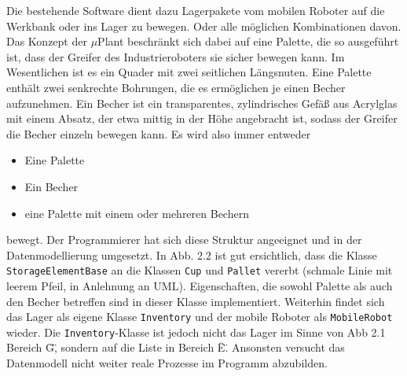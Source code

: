     Die bestehende Software dient dazu Lagerpakete vom mobilen Roboter auf die Werkbank oder ins Lager zu bewegen.
    Oder alle möglichen Kombinationen davon.
    Das Konzept der $\mu$Plant beschränkt sich dabei auf eine Palette, die so ausgeführt ist, dass der Greifer des
    Industrieroboters sie sicher bewegen kann.
    Im Wesentlichen ist es ein Quader mit zwei seitlichen Längsnuten.
    Eine Palette enthält zwei senkrechte Bohrungen, die es ermöglichen je einen Becher aufzunehmen.
    Ein Becher ist ein transparentes, zylindrisches Gefäß aus Acrylglas mit einem Absatz, der etwa mittig in der
    Höhe angebracht ist, sodass der Greifer die Becher einzeln bewegen kann.
    Es wird also immer entweder
    \begin{itemize}
        \item Eine Palette
        \item Ein Becher
        \item eine Palette mit einem oder mehreren Bechern
    \end{itemize}
    bewegt.
    Der Programmierer hat sich diese Struktur angeeignet und in der Datenmodellierung umgesetzt.
    In Abb. 2.2 ist gut ersichtlich, dass die Klasse \verb|StorageElementBase| an die Klassen \verb|Cup| und \verb|Pallet|
    vererbt (schmale Linie mit leerem Pfeil, in Anlehnung an UML). Eigenschaften, die sowohl Palette als auch den
    Becher betreffen sind in dieser Klasse implementiert.
    Weiterhin findet sich das Lager als eigene Klasse \verb|Inventory| und der mobile Roboter als \verb|MobileRobot| wieder.
    Die \verb|Inventory|-Klasse ist jedoch nicht das Lager im Sinne von Abb 2.1 Bereich \"G\", sondern auf die Liste in
    Bereich \"E\".
    Ansonsten versucht das Datenmodell nicht weiter reale Prozesse im Programm abzubilden.
    \\
